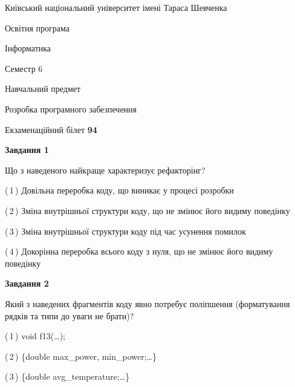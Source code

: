 \documentclass[10pt, ukrainian]{article}
\begin{document}
{{\begin {small}\par
{ \center  Київський національний університет імені Тараса Шевченка \par}
{\parbox {5 cm}{Освітня програма \hfill}{\parbox {7 cm}{Інформатика \hfill}}\parbox {6 cm}{\hfill Семестр 6}}\par
{\parbox {5 cm} {Навчальний предмет \hfill}\parbox {7 cm}{Розробка програмного забезпечення \hfill}\parbox {6cm}{\hfill}\par}\vspace{-7pt} \end{small}}{\center Екзаменаційний білет \No \textbf
{ 94 }\par}}
{
\begin {large}
{\begin {center}\textbf{Завдання 1}\end {center}}\par
Що з наведеного найкраще характеризує рефакторінг?\par
\vspace{2mm}



(\,1\,) Довільна переробка коду, що виникає у процесі розробки%



(\,2\,) Зміна внутрішньої структури коду, що не змінює його видиму поведінку%



(\,3\,) Зміна внутрішньої структури коду під час усунення помилок%



(\,4\,) Докорінна переробка всього коду з нуля,  що не змінює його видиму поведінку%


{\begin {center}\textbf{Завдання 2}\end {center}}\par
Який з наведених фрагментів коду явно потребує поліпшення (форматування рядків та типи до уваги не брати)?\par
\vspace{2mm}



(\,1\,) void f13(…);%



(\,2\,) \{double max\_power, min\_power;…\} %



(\,3\,) \{double avg\_temperature;…\} %




\end{large}}
\end{document}
